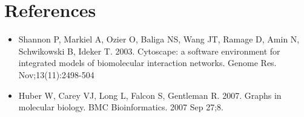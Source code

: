 \documentclass[12pt]{article}
\begin{document}
\section{References}

\begin{itemize}

\item Shannon P, Markiel A, Ozier O, Baliga NS, Wang JT, Ramage D, Amin N, Schwikowski B, Ideker T. 2003. Cytoscape: a software environment for integrated models of biomolecular interaction networks. Genome Res. Nov;13(11):2498-504

\item Huber W, Carey VJ, Long L, Falcon S, Gentleman R. 2007. Graphs in molecular biology. BMC Bioinformatics. 2007 Sep 27;8.

\end{itemize}
\end{document}
